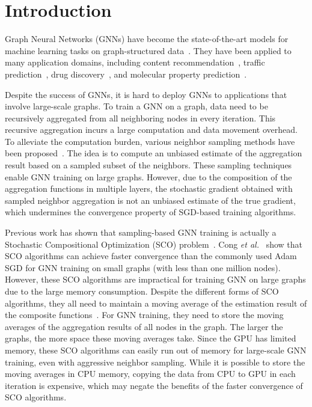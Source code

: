 \section{Introduction}
Graph Neural Networks (GNNs) have become the state-of-the-art models for machine learning tasks on graph-structured data~\cite{kipf2017semi, duran2017learning, zhang2017weisfeiler, zhang2018link, ying2018hierarchical, gilmer2017neural}. 
They have been applied to many application domains, including content recommendation~\cite{ying2018graph}, traffic prediction~\cite{zhang2018gaan},  drug discovery~\cite{li2018learning}, and molecular property prediction~\cite{gilmer2017neural}.  

Despite the success of GNNs, it is hard to deploy GNNs to applications that involve large-scale graphs. 
To train a GNN on a graph, data need to be recursively aggregated from all neighboring nodes in every iteration. 
This recursive aggregation incurs a large computation and data movement overhead. 
To alleviate the computation burden, various neighbor sampling methods have been proposed~\cite{hamilton2017inductive, ying2018graph, chen2018fastgcn, zou2019layer, AAAI1816642, chiang2019cluster, Zeng2020GraphSAINT}. 
The idea is to compute an unbiased estimate of the aggregation result based on a sampled subset of the neighbors. 
These sampling techniques enable GNN training on large graphs. 
However, 
due to the composition of the aggregation functions in multiple layers, 
the stochastic gradient obtained with sampled neighbor aggregation is not an unbiased estimate of the true gradient, which undermines the convergence property of SGD-based training algorithms. 

Previous work has shown that sampling-based GNN training is actually a Stochastic Compositional Optimization (SCO) problem~\cite{cong2020minimal, jiang2021communicationefficient, cong2021importance}. 
Cong {\em et al.}~\cite{cong2021importance} show that SCO algorithms can achieve faster convergence than the commonly used Adam SGD for GNN training on small graphs (with less than one million nodes). 
However, these SCO algorithms are impractical for training GNN on large graphs due to the large memory consumption. 
Despite the different forms of SCO algorithms, they all need to maintain a moving average of the estimation result of the composite functions~\cite{yang2019multilevel, balasubramanian2020stochastic, chen2020solving, lian2017finite, wang2017accelerating, ghadimi2020single}. 
For GNN training, they need to store the moving averages of the aggregation results of all nodes in the graph. 
The larger the graphs, the more space these moving averages take. 
Since the GPU has limited memory, these SCO algorithms can easily run out of memory for large-scale GNN training, even with aggressive neighbor sampling. 
While it is possible to store the moving averages in CPU memory, copying the data from CPU to GPU in each iteration is expensive, which may negate the benefits of the faster convergence of SCO algorithms. 

